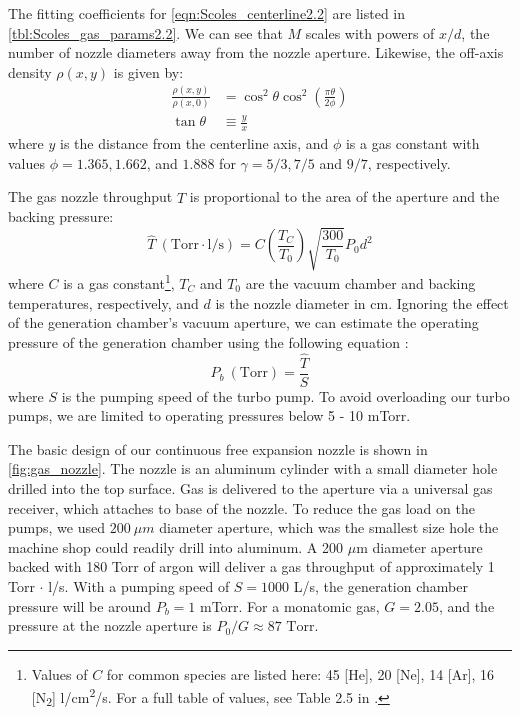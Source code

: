 The fitting coefficients for \cref{eqn:Scoles_centerline2.2} are listed in \cref{tbl:Scoles_gas_params2.2}. We can see that $M$ scales with powers of $x/d$, the number of nozzle diameters away from the nozzle aperture. Likewise, the off-axis density $\rho(x,y)$ is given by:
\begin{align}
\frac{\rho(x,y)}{\rho(x,0)} &= \cos^2 \theta \cos^2 \left( \frac{\pi \theta}{2 \phi} \right) \\
\tan \theta &\equiv \frac{y}{x}
\label{eqn:off-axis-density}
\end{align}
where $y$ is the distance from the centerline axis, and $\phi$ is a gas constant with values ${\phi = 1.365, 1.662}$, and $1.888$ for ${\gamma = 5/3, 7/5}$ and $9/7$, respectively.

The gas nozzle throughput $\hat{T}$ is proportional to the area of the aperture and the backing pressure:
\begin{equation}
\hat{T} \ (\text{Torr} \cdot \text{l}/\text{s}) = C \left(\frac{T_C}{T_0} \right)\sqrt{\frac{300}{T_0}} P_0 d^2
\label{eqn:nozzle_thruput}
\end{equation}
where $C$ is a gas constant\footnote{Values of $C$ for common species are listed here: 45 [He], 20 [Ne], 14 [Ar], 16 [N\textsubscript{2}] l/cm\textsuperscript{2}/s. For a full table of values, see Table 2.5 in \cite{millerFreeJetSources1988}.}, $T_C$ and $T_0$ are the vacuum chamber and backing temperatures, respectively, and $d$ is the nozzle diameter in cm. Ignoring the effect of the generation chamber's vacuum aperture, we can estimate the operating pressure of the generation chamber using the following equation \cite{hablanianHighvacuumTechnologyPractical1997}:
\begin{equation}
P_b \ (\text{Torr}) = \frac{\hat{T}}{S}
\end{equation}
where $S$ is the pumping speed of the turbo pump. To avoid overloading our turbo pumps, we are  limited to operating pressures below 5 - 10 mTorr.

The basic design of our continuous free expansion nozzle is shown in \cref{fig:gas_nozzle}. The nozzle is an aluminum cylinder with a small diameter hole drilled into the top surface. Gas is delivered to the aperture via a universal gas receiver, which attaches to base of the nozzle. To reduce the gas load on the pumps, we used $200 \ \mu m$ diameter aperture, which was the smallest size hole the machine shop could readily drill into aluminum. A 200 $\mu$m diameter aperture backed with 180 Torr of argon will deliver a gas throughput of approximately {1 Torr $\cdot$ l/s}. With a pumping speed of $S = 1000$ L/s, the generation chamber pressure will be around $P_b = 1$ mTorr. For a monatomic gas, $G = 2.05$, and the pressure at the nozzle aperture is $P_0/G \approx 87 \textrm{ Torr}$.

